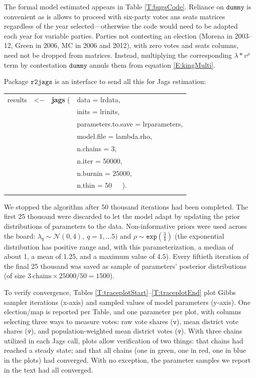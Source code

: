 \documentclass[letter,12pt]{article}
\begin{document}
The formal model estimated appears in Table \ref{T:bugsCode}. Reliance on $\texttt{dummy}$ is convenient as is allows to proceed with six-party votes ans seats matrices regardless of the year selected---otherwise the code would need to be adapted each year for variable parties. Parties not contesting an election (Morena in 2003--12, Green in 2006, MC in 2006 and 2012), with zero votes and seats columns, need not be dropped from matrices. Instead, multiplying the corresponding $\lambda * v^\rho$ term by contestation $\texttt{dummy}$ annuls them from equation \ref{E:kingMulti}. 

Package $\texttt{r2jags}$ \citep{r.r2jags} is an interface to send all this for Jags estimation:

\begin{center}
\begin{tabular}{ll}
\\
results~~<$-$~~\textbf{jags} ( & data = lrdata, \\ 
                  & inits = lrinits, \\
                  & parameters.to.save = lrparameters, \\
                  & model.file = lambda.rho, \\
                  & n.chains = 3, \\
                  & n.iter = 50000, \\
                  & n.burnin = 25000, \\
                  & n.thin = 50~~~). \\ \\
\end{tabular}
\end{center}

\noindent We stopped the algorithm after 50 thousand iterations had been completed. The first 25 thousand were discarded to let the model adapt by updating the prior distributions of parameters to the data. Non-informative priors were used across the board: $\lambda_q \sim \mathcal{N}(0, 4),~q=1,\ldots5)$ and $\rho \sim \texttt{exp}(\frac{3}{4})$ (the exponential distribution has positive range and, with this parameterization, a median of about 1, a mean of 1.25, and a maximum value of 4.5). Every fiftieth iteration of the final 25 thousand was saved as sample of parameters' posterior distributions (of size $3~\text{chains} \times 25000/50 = 1500$). 

To verify convergence, Tables \ref{T:traceplotStart}--\ref{T:traceplotEnd} plot Gibbs sampler iterations (x-axis) and sampled values of model parameters (y-axis). One election/map is reported per Table, and one parameter per plot, with columns selecting three ways to measure votes: raw vote shares ($\texttt{v}$), mean district vote shares ($\bar{\texttt{v}}$), and population-weighted mean district votes ($\bar{\texttt{v}}$). With three chains utilized in each Jags call, plots allow verification of two things: that chains had reached a steady state; and that all chains (one in green, one in red, one in blue in the plots) had converged. With no exception, the parameter samples we report in the text had all converged.
\end{document}
